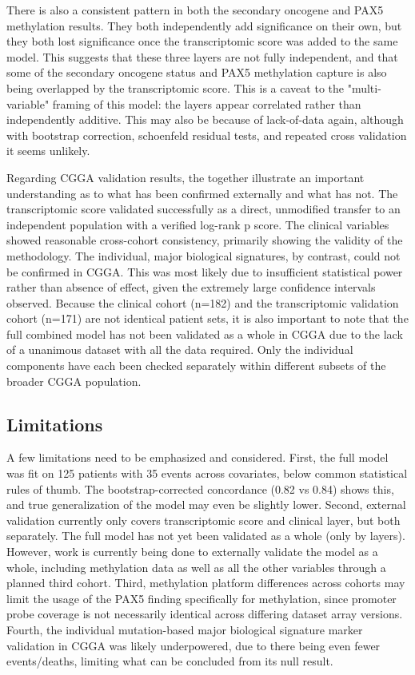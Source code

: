 \documentclass[11pt, letterpaper]{article}
\begin{document}
There is also a consistent pattern in both the secondary oncogene and PAX5 methylation results. They both independently add significance on their own, but they both lost significance once the transcriptomic score was added to the same model. This suggests that these three layers are not fully independent, and that some of the secondary oncogene status and PAX5 methylation capture is also being overlapped by the transcriptomic score. This is a caveat to the "multi-variable" framing of this model: the layers appear correlated rather than independently additive. This may also be because of lack-of-data again, although with bootstrap correction, schoenfeld residual tests, and repeated cross validation it seems unlikely.

Regarding CGGA validation results, the together illustrate an important understanding as to what has been confirmed externally and what has not. The transcriptomic score validated successfully as a direct, unmodified transfer to an independent population with a verified log-rank p score.  The clinical variables showed reasonable cross-cohort consistency, primarily showing the validity of the methodology. The individual, major biological signatures, by contrast, could not be confirmed in CGGA. This was most likely due to insufficient statistical power rather than absence of effect, given the extremely large confidence intervals observed. Because the clinical cohort (n=182) and the transcriptomic validation cohort (n=171) are not identical patient sets, it is also important to note that the full combined model has not been validated as a whole in CGGA due to the lack of a unanimous dataset with all the data required. Only the individual components have each been checked separately within different subsets of the broader CGGA population.

\subsection{Limitations}

A few limitations need to be emphasized and considered. First, the full model was fit on 125 patients with 35 events across covariates, below common statistical rules of thumb. The bootstrap-corrected concordance (0.82 vs 0.84) shows this, and true generalization of the model may even be slightly lower. Second, external validation currently only covers transcriptomic score and clinical layer, but both separately. The full model has not yet been validated as a whole (only by layers). However, work is currently being done to externally validate the model as a whole, including methylation data as well as all the other variables through a planned third cohort. Third, methylation platform differences across cohorts may limit the usage of the PAX5 finding specifically for methylation, since promoter probe coverage is not necessarily identical across differing dataset array versions. Fourth, the individual mutation-based major biological signature marker validation in CGGA was likely underpowered, due to there being even fewer events/deaths, limiting what can be concluded from its null result. 
\end{document}
